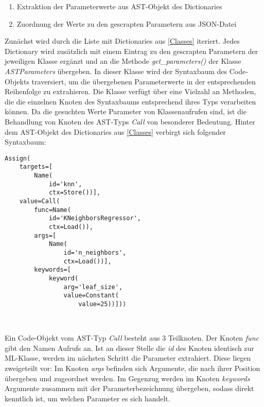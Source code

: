 \documentclass[german,bachelor]{swsLeipzig}
\begin{document}
\begin{enumerate}
 \item Extraktion der Parameterwerte aus AST-Objekt des Dictionaries
 \item Zuordnung der Werte zu den gescrapten Parametern aus JSON-Datei
\end{enumerate}

Zunächst wird durch die Liste mit Dictionaries aus \ref{Classes} iteriert.
Jedes Dictionary wird zusätzlich mit einem Eintrag zu den gescrapten Parametern der jeweiligen Klasse ergänzt und an die Methode \textit{get\_parameters()}
der Klasse \textit{ASTParameters} übergeben.
In dieser Klasse wird der Syntaxbaum des Code-Objekts traversiert, um die übergebenen Parameterwerte in der
entsprechenden Reihenfolge zu extrahieren.
Die Klasse verfügt über eine Vielzahl an Methoden, die die einzelnen Knoten des Syntaxbaums entsprechend ihres Typs
verarbeiten können.
Da die gesuchten Werte Parameter von Klassenaufrufen sind, ist die Behandlung von Knoten des AST-Typs \textit{Call} von
besonderer Bedeutung.
Hinter dem AST-Objekt des Dictionaries aus \ref{Classes} verbirgt sich folgender Syntaxbaum: \\

\noindent\begin{minipage}{\linewidth}
\begin{lstlisting}[frame=single, label=class_dict, basicstyle=\small, caption={AST der KNeighborsRegressor-Klasse},captionpos=b]
Assign(
    targets=[
        Name(
            id='knn',
            ctx=Store())],
    value=Call(
        func=Name(
            id='KNeighborsRegressor',
            ctx=Load()),
        args=[
            Name(
                id='n_neighbors',
                ctx=Load())],
        keywords=[
            keyword(
                arg='leaf_size',
                value=Constant(
                    value=25))]))
\end{lstlisting}
\end{minipage}
\

Ein Code-Objekt vom AST-Typ \textit{Call} besteht aus 3 Teilknoten.
Der Knoten \textit{func} gibt den Namen Aufrufs an.
Ist an dieser Stelle die \textit{id} des Knoten identisch zur ML-Klasse, werden im nächsten Schritt die Parameter
extrahiert.
Diese liegen zweigeteilt vor:
Im Knoten \textit{args} befinden sich Argumente, die nach ihrer Position übergeben und zugeordnet werden.
Im Gegenzug werden im Knoten \textit{keywords} Argumente zusammen mit der Parameterbezeichnung übergeben, sodass direkt kenntlich
ist, um welchen Parameter es sich handelt. \\
\end{document}
